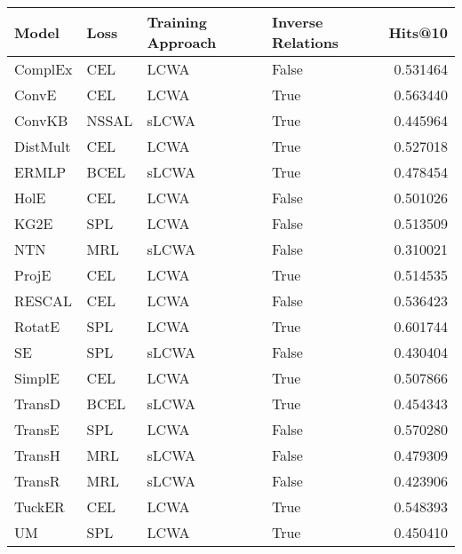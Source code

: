 \begin{tabular}{llllr}
\toprule
    Model &   Loss & Training Approach & Inverse Relations &   Hits@10 \\
\midrule
  ComplEx &    CEL &              LCWA &             False &  0.531464 \\
    ConvE &    CEL &              LCWA &              True &  0.563440 \\
   ConvKB &  NSSAL &             sLCWA &              True &  0.445964 \\
 DistMult &    CEL &              LCWA &              True &  0.527018 \\
    ERMLP &   BCEL &             sLCWA &              True &  0.478454 \\
     HolE &    CEL &              LCWA &             False &  0.501026 \\
     KG2E &    SPL &              LCWA &             False &  0.513509 \\
      NTN &    MRL &             sLCWA &             False &  0.310021 \\
    ProjE &    CEL &              LCWA &              True &  0.514535 \\
   RESCAL &    CEL &              LCWA &             False &  0.536423 \\
   RotatE &    SPL &              LCWA &              True &  0.601744 \\
       SE &    SPL &             sLCWA &             False &  0.430404 \\
   SimplE &    CEL &              LCWA &              True &  0.507866 \\
   TransD &   BCEL &             sLCWA &              True &  0.454343 \\
   TransE &    SPL &              LCWA &             False &  0.570280 \\
   TransH &    MRL &             sLCWA &             False &  0.479309 \\
   TransR &    MRL &             sLCWA &             False &  0.423906 \\
   TuckER &    CEL &              LCWA &              True &  0.548393 \\
       UM &    SPL &              LCWA &              True &  0.450410 \\
\bottomrule
\end{tabular}

